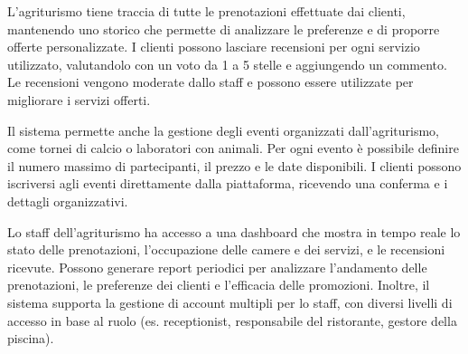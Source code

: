 \documentclass[a4paper,11pt]{report}
\begin{document}
L'agriturismo tiene traccia di tutte le prenotazioni effettuate dai clienti, mantenendo uno storico che permette di analizzare le preferenze e di
proporre offerte personalizzate. I clienti possono lasciare recensioni per ogni servizio utilizzato, valutandolo con un voto da 1 a 5
stelle e aggiungendo un commento. Le recensioni vengono moderate dallo staff e possono essere utilizzate per migliorare i servizi offerti.

Il sistema permette anche la gestione degli eventi organizzati dall'agriturismo, come tornei di calcio o laboratori con animali. Per ogni
evento è possibile definire il numero massimo di partecipanti, il prezzo e le date disponibili. I clienti possono iscriversi agli
eventi direttamente dalla piattaforma, ricevendo una conferma e i dettagli organizzativi.

Lo staff dell'agriturismo ha accesso a una dashboard che mostra in tempo reale lo stato delle prenotazioni, l'occupazione delle
camere e dei servizi, e le recensioni ricevute. Possono generare report periodici per analizzare l'andamento delle prenotazioni, le
preferenze dei clienti e l'efficacia delle promozioni. Inoltre, il sistema supporta la gestione di account multipli per lo staff, con
diversi livelli di accesso in base al ruolo (es. receptionist, responsabile del ristorante, gestore della piscina).
\end{document}
